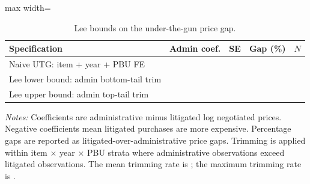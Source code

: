 \begin{table}[ht]
\centering
\caption{Lee bounds on the under-the-gun price gap.}
\label{tab:utg_lee_bounds}
\begin{threeparttable}
\small
\setlength{\tabcolsep}{4pt}
\begin{adjustbox}{max width=\textwidth}
\begin{tabular}{p{.38\linewidth}rrrr}
\toprule
Specification & Admin coef. & SE & Gap (\%) & $N$ \\
\midrule
Naive UTG: item + year + PBU FE & \BPutgPointNaiveCoef{} & \BPutgPointNaiveSE{} & \BPutgPointNaive{} & \BPutgPointNaiveN{} \\
Lee lower bound: admin bottom-tail trim & \BPutgBoundLowCoef{} & \BPutgBoundLowSE{} & \BPutgBoundLow{} & \BPutgBoundLowN{} \\
Lee upper bound: admin top-tail trim & \BPutgBoundHighCoef{} & \BPutgBoundHighSE{} & \BPutgBoundHigh{} & \BPutgBoundHighN{} \\
\bottomrule
\end{tabular}
\end{adjustbox}
\begin{tablenotes}[flushleft]\footnotesize
\item \textit{Notes:} Coefficients are administrative minus litigated log negotiated prices. Negative coefficients mean litigated purchases are more expensive. Percentage gaps are reported as litigated-over-administrative price gaps. Trimming is applied within item $\times$ year $\times$ PBU strata where administrative observations exceed litigated observations. The mean trimming rate is \BPutgLeeTrimMean{}; the maximum trimming rate is \BPutgLeeTrimMax{}.
\end{tablenotes}
\end{threeparttable}
\end{table}
